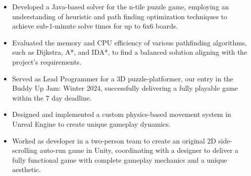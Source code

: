 \documentclass[10pt,a4paper,ragged2e,withhyper]{altacv}
\begin{document}
\begin{paracol}{2}
\begin{itemize}
            \item Developed a Java-based solver for the n-tile puzzle game, employing an understanding of heuristic and path finding optimization techniques to achieve sub-1-minute solve times for up to 6x6 boards.
            \item Evaluated the memory and CPU efficiency of various pathfinding algorithms, such as Dijkstra, A*, and IDA*, to find a balanced solution aligning with the project's requirements.
            \end{itemize}
            \vspace{-0.5em}
            \divider
            \vspace{0.5em}
            \vspace{-0.5em}
            \begin{itemize}
            \item Served as Lead Programmer for a 3D puzzle-platformer, our entry in the Buddy Up Jam: Winter 2024, successfully delivering a fully playable game within the 7 day deadline.
            \item Designed and implemented a custom physics-based movement system in Unreal Engine to create unique gameplay dynamics.
            \end{itemize}
            \vspace{-0.5em}
            \divider
            \vspace{0.5em}
            \vspace{-0.5em}
            \begin{itemize}
            \item Worked as developer in a two-person team to create an original 2D side-scrolling auto-run game in Unity, coordinating with a designer to deliver a fully functional game with complete gameplay mechanics and a unique aesthetic.
            \end{itemize}
        \end{paracol}
        \newpage

        \makecvheader
\end{document}
